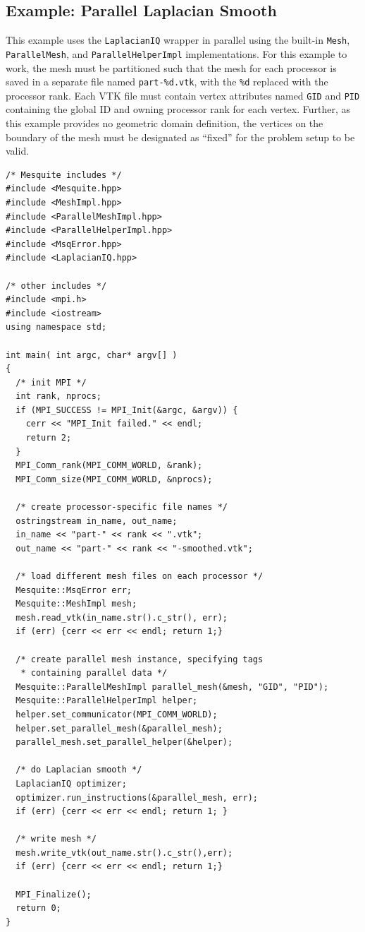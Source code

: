 \subsection{Example: Parallel Laplacian Smooth}
\label{sec:parallel-example-1}

This example uses the \texttt{LaplacianIQ} wrapper in parallel using the built-in \texttt{Mesh}, \texttt{ParallelMesh}, and \texttt{ParallelHelperImpl} implementations.  For this example to work, the mesh must be partitioned such that the mesh for each processor is saved in a separate file named \texttt{part-\%d.vtk}, with the \texttt{\%d} replaced with the processor rank.  Each VTK file must contain vertex attributes named \texttt{GID} and \texttt{PID} containing the global ID and owning processor rank for each vertex.  Further, as this example provides no geometric domain definition, the vertices on the boundary of the mesh must be designated as ``fixed'' for the problem setup to be valid.


\begin{verbatim}
/* Mesquite includes */
#include <Mesquite.hpp>
#include <MeshImpl.hpp>
#include <ParallelMeshImpl.hpp>
#include <ParallelHelperImpl.hpp>
#include <MsqError.hpp>
#include <LaplacianIQ.hpp>

/* other includes */
#include <mpi.h>
#include <iostream>
using namespace std;
  
int main( int argc, char* argv[] )
{
  /* init MPI */
  int rank, nprocs;
  if (MPI_SUCCESS != MPI_Init(&argc, &argv)) {
    cerr << "MPI_Init failed." << endl;
    return 2;
  }
  MPI_Comm_rank(MPI_COMM_WORLD, &rank);
  MPI_Comm_size(MPI_COMM_WORLD, &nprocs);

  /* create processor-specific file names */
  ostringstream in_name, out_name;
  in_name << "part-" << rank << ".vtk";
  out_name << "part-" << rank << "-smoothed.vtk";

  /* load different mesh files on each processor */
  Mesquite::MsqError err;
  Mesquite::MeshImpl mesh;
  mesh.read_vtk(in_name.str().c_str(), err);
  if (err) {cerr << err << endl; return 1;}

  /* create parallel mesh instance, specifying tags 
   * containing parallel data */
  Mesquite::ParallelMeshImpl parallel_mesh(&mesh, "GID", "PID");
  Mesquite::ParallelHelperImpl helper;
  helper.set_communicator(MPI_COMM_WORLD);
  helper.set_parallel_mesh(&parallel_mesh);
  parallel_mesh.set_parallel_helper(&helper);

  /* do Laplacian smooth */
  LaplacianIQ optimizer;
  optimizer.run_instructions(&parallel_mesh, err);
  if (err) {cerr << err << endl; return 1; }

  /* write mesh */
  mesh.write_vtk(out_name.str().c_str(),err);
  if (err) {cerr << err << endl; return 1;}

  MPI_Finalize();
  return 0;
}
\end{verbatim}

